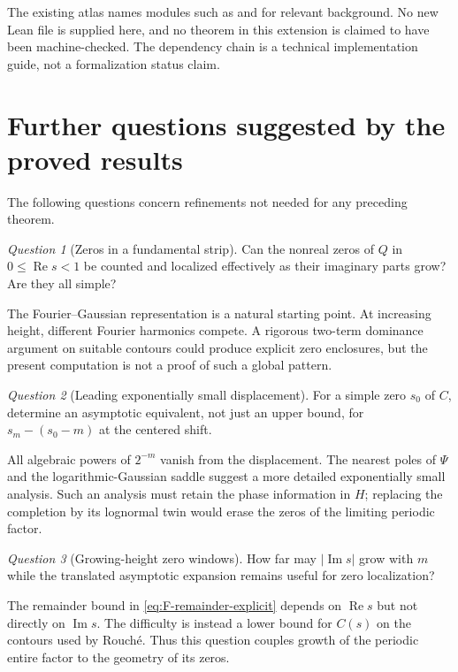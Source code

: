 \documentclass[11pt,a4paper]{article}
\numberwithin{equation}{section}
\theoremstyle{definition}
\theoremstyle{remark}
\newtheorem{question}[question]{Question}
\newcommand{\Rea}{\operatorname{Re}}
\newcommand{\Ima}{\operatorname{Im}}
\newcommand{\abs}[1]{\left|#1\right|}
\begin{document}
The existing atlas names modules such as
 and
 for relevant background.
No new Lean file is supplied here, and no theorem in this extension
is claimed to have been machine-checked. The dependency chain is a
technical implementation guide, not a formalization status claim.

\section{Further questions suggested by the proved results}
\label{sec:questions}
The following questions concern refinements not needed for any
preceding theorem.

\begin{question}[Zeros in a fundamental strip]
Can the nonreal zeros of $Q$ in $0\le\Rea s<1$ be counted and
localized effectively as their imaginary parts grow? Are they all
simple?
\end{question}
The Fourier--Gaussian representation is a natural starting point.
At increasing height, different Fourier harmonics compete. A
rigorous two-term dominance argument on suitable contours could
produce explicit zero enclosures, but the present computation is
not a proof of such a global pattern.

\begin{question}[Leading exponentially small displacement]
For a simple zero $s_0$ of $C$, determine an asymptotic equivalent,
not just an upper bound, for $s_m-(s_0-m)$ at the centered shift.
\end{question}
All algebraic powers of $2^{-m}$ vanish from the displacement.
The nearest poles of $\Psi$ and the logarithmic-Gaussian saddle
suggest a more detailed exponentially small analysis. Such an
analysis must retain the phase information in $H$; replacing the
completion by its lognormal twin would erase the zeros of the
limiting periodic factor.

\begin{question}[Growing-height zero windows]
How far may $\abs{\Ima s}$ grow with $m$ while the translated
asymptotic expansion remains useful for zero localization?
\end{question}
The remainder bound in \cref{eq:F-remainder-explicit} depends on
$\Rea s$ but not directly on $\Ima s$. The difficulty is instead a
lower bound for $C(s)$ on the contours used by Rouch\'e. Thus this
question couples growth of the periodic entire factor to the
geometry of its zeros.
\end{document}
